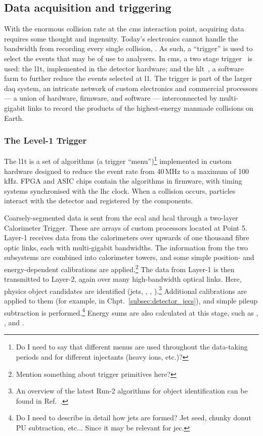 \subsection{Data acquisition and triggering}
\label{subsec:cms_recording_data}

With the enormous collision rate at the \acrshort{cms} interaction point, acquiring data requires some thought and ingenuity. Today's electronics cannot handle the bandwidth from recording every single collision, . As such, a ``trigger'' is used to select the events that may be of use to analysers. In \acrshort{cms}, a two stage trigger~\cite{Bayatyan:706847} is used: the \acrfull{l1t}, implemented in the detector hardware; and the \acrfull{hlt}~\cite{Cittolin:578006}, a software farm to further reduce the events selected at \acrlong{l1}. The trigger is part of the larger \acrfull{daq} system, an intricate network of custom electronics and commercial processors --- a union of hardware, firmware, and software --- interconnected by multi-gigabit links to record the products of the highest-energy manmade collisions on Earth.




\subsubsection{The Level-1 Trigger}
\label{subsubsec:detector_l1t}

The \acrlong{l1t} is a set of algorithms (a trigger ``menu'')\footnote{Do I need to say that different menus are used throughout the data-taking periods and for different injectants (heavy ions, etc.)?} implemented in custom hardware designed to reduce the event rate from 40\,MHz to a maximum of 100\,kHz. FPGA and ASIC chips contain the algorithms in firmware, with timing systems synchronised with the \acrshort{lhc} clock. When a collision occurs, particles interact with the detector and registered by the components.

Coarsely-segmented data is sent from the \acrshort{ecal} and \acrshort{hcal} through a two-layer Calorimeter Trigger. These are arrays of custom processors located at Point 5. Layer-1 receives data from the calorimeters over upwards of one thousand fibre optic links, each with multi-gigabit bandwidths. The information from the two subsystems are combined into calorimeter towers, and some simple position- and energy-dependent calibrations are applied.\footnote{Mention something about trigger primitives here?} The data from Layer-1 is then transmitted to Layer-2, again over many high-bandwidth optical links. Here, physics object candidates are identified (\glspl{jet}, \Pe, \Pphoton, \Ptau).\footnote{An overview of the latest Run-2 algorithms for object identification can be found in Ref.~.} Additional calibrations are applied to them (for example, in Chpt.~\ref{subsec:detector_jecs}), and simple pileup subtraction is performed.\footnote{Do I need to describe in detail how jets are formed? Jet seed, chunky donut PU subtraction, etc... Since it may be relevant for \acrshort{jec}.} Energy sums are also calculated at this stage, such as \etmiss, \HT, and \mht.


